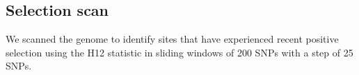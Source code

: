 \documentclass{pnastwo}
\begin{document}
\begin{article}
\begin{materials}


\subsection{Selection scan}
We scanned the genome to identify sites that have experienced recent positive selection using the H12 statistic \cite{garud2015} in sliding windows of 200 SNPs with a step of 25 SNPs.





\end{materials}
\end{article}
\end{document}
